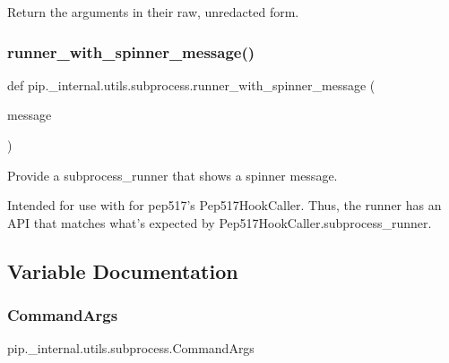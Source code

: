 \begin{DoxyVerb}Return the arguments in their raw, unredacted form.
\end{DoxyVerb}
 \mbox{\label{namespacepip_1_1__internal_1_1utils_1_1subprocess_a1a8d53bdd89463ba5941dfb10aaf153b}} 
\subsubsection{\texorpdfstring{runner\+\_\+with\+\_\+spinner\+\_\+message()}{runner\_with\_spinner\_message()}}
{\footnotesize\ttfamily def pip.\+\_\+internal.\+utils.\+subprocess.\+runner\+\_\+with\+\_\+spinner\+\_\+message (\begin{DoxyParamCaption}\item[{}]{message }\end{DoxyParamCaption})}

\begin{DoxyVerb}Provide a subprocess_runner that shows a spinner message.

Intended for use with for pep517's Pep517HookCaller. Thus, the runner has
an API that matches what's expected by Pep517HookCaller.subprocess_runner.
\end{DoxyVerb}
 

\subsection{Variable Documentation}
\mbox{\label{namespacepip_1_1__internal_1_1utils_1_1subprocess_aa5735a299d9c96782540b9e5d56361f2}} 
\subsubsection{\texorpdfstring{Command\+Args}{CommandArgs}}
{\footnotesize\ttfamily pip.\+\_\+internal.\+utils.\+subprocess.\+Command\+Args}

